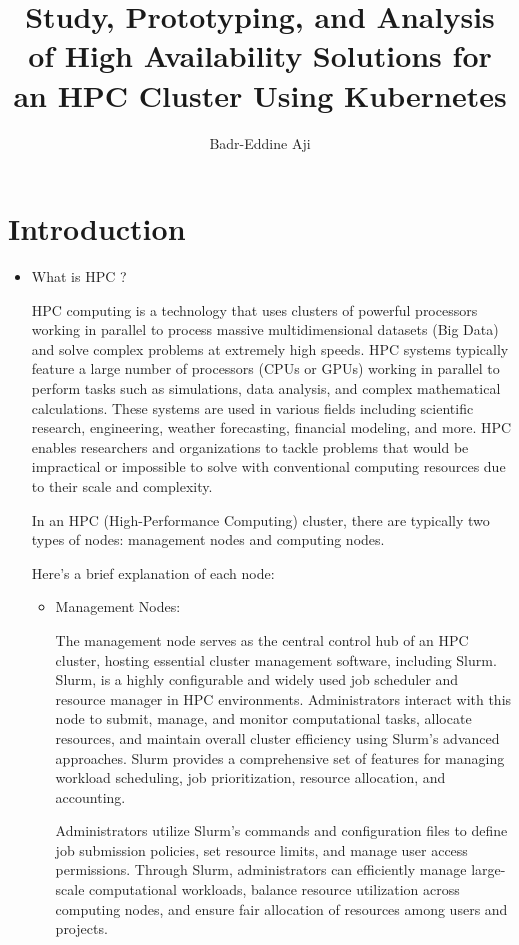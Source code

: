 \documentclass{article}
\title{Study, Prototyping, and Analysis of High Availability Solutions for an HPC Cluster Using Kubernetes}
\author{ Badr-Eddine Aji}
\date{}
\begin{document}
\maketitle

\section{Introduction}
\begin{itemize}
    \item What is HPC ?
     
HPC computing is a technology that uses clusters of powerful processors working in parallel to process massive multidimensional datasets (Big Data) and solve complex problems at extremely high speeds. HPC systems typically feature a large number of processors (CPUs or GPUs) working in parallel to perform tasks such as simulations, data analysis, and complex mathematical calculations.
These systems are used in various fields including scientific research, engineering, weather forecasting, financial modeling, and more. HPC enables researchers and organizations to tackle problems that would be impractical or impossible to solve with conventional computing resources due to their scale and complexity.

In an HPC (High-Performance Computing) cluster, there are typically two types of nodes: management nodes and computing nodes.

Here's a brief explanation of each node:
\begin{itemize}
    \item Management Nodes:
    
The management node serves as the central control hub of an HPC cluster, hosting essential cluster management software, including Slurm. Slurm, is a highly configurable and widely used job scheduler and resource manager in HPC environments. Administrators interact with this node to submit, manage, and monitor computational tasks, allocate resources, and maintain overall cluster efficiency using Slurm's advanced approaches. Slurm provides a comprehensive set of features for managing workload scheduling, job prioritization, resource allocation, and accounting.

Administrators utilize Slurm's commands and configuration files to define job submission policies, set resource limits, and manage user access permissions. Through Slurm, administrators can efficiently manage large-scale computational workloads, balance resource utilization across computing nodes, and ensure fair allocation of resources among users and projects.


\end{itemize}
\end{itemize}
\end{document}
